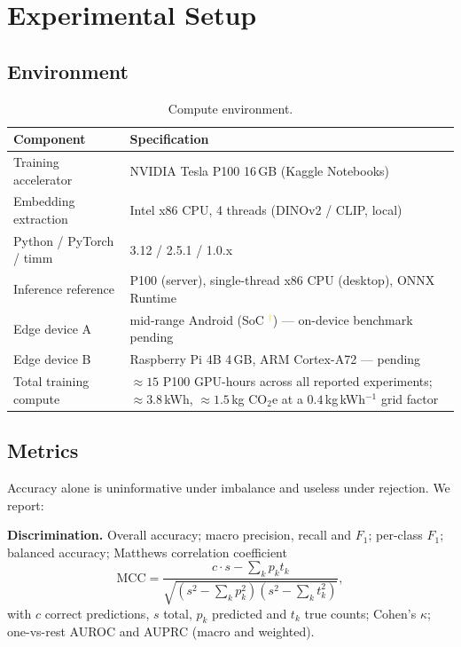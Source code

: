 \documentclass[10pt,twocolumn,a4paper]{article}
\newcommand{\VER}{\textcolor{gold}{$^{\dagger}$}}
\begin{document}
\section{Experimental Setup}
\label{sec:setup}

\subsection{Environment}
\begin{table}[H]
\centering
\caption{Compute environment.}
\label{tab:env}
{\footnotesize
\begin{tabularx}{\columnwidth}{@{}p{2.5cm} X@{}}
\toprule
\rowcolor{hdrgray}
Component & Specification \\
\midrule
Training accelerator & NVIDIA Tesla P100 16\,GB (Kaggle Notebooks) \\
Embedding extraction & Intel x86 CPU, 4 threads (DINOv2 / CLIP, local) \\
Python / PyTorch / timm & 3.12 / 2.5.1 / 1.0.x \\
Inference reference & P100 (server), single-thread x86 CPU (desktop), ONNX Runtime \\
Edge device A & mid-range Android (SoC \VER) --- on-device benchmark pending \\
Edge device B & Raspberry Pi 4B 4\,GB, ARM Cortex-A72 --- pending \\
Total training compute & $\approx15$ P100 GPU-hours across all reported experiments; $\approx3.8$\,kWh, $\approx1.5$\,kg CO$_2$e at a $0.4$\,kg\,kWh$^{-1}$ grid factor \\
\bottomrule
\end{tabularx}}
\end{table}

\subsection{Metrics}
\label{sec:metrics}
Accuracy alone is uninformative under imbalance and useless under rejection. We report:

\textbf{Discrimination.} Overall accuracy; macro precision, recall and $F_1$; per-class $F_1$; balanced accuracy; Matthews correlation coefficient
\begin{equation}
\mathrm{MCC}=\frac{c\!\cdot\! s-\sum_k p_k t_k}{\sqrt{(s^2-\sum_k p_k^2)(s^2-\sum_k t_k^2)}},
\end{equation}
with $c$ correct predictions, $s$ total, $p_k$ predicted and $t_k$ true counts; Cohen's $\kappa$; one-vs-rest AUROC and AUPRC (macro and weighted).
\end{document}
